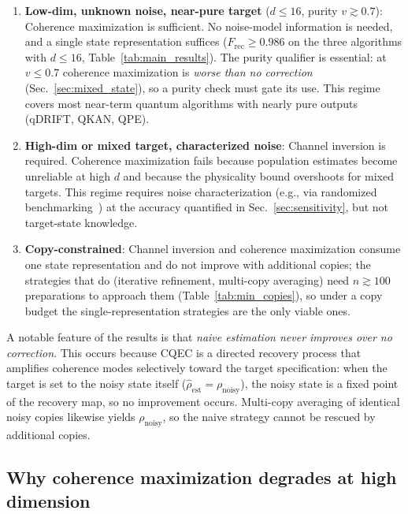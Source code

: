 \documentclass[pra,twocolumn,superscriptaddress,longbibliography,floatfix,nofootinbib]{revtex4-2}
\newcommand{\Frec}{F_\mathrm{rec}}
\newcommand{\rhon}{\rho_\mathrm{noisy}}
\newcommand{\rhoe}{\hat{\rho}_\mathrm{est}}
\begin{document}
\begin{enumerate}
\item \textbf{Low-dim, unknown noise, near-pure target} ($d \leq 16$, purity $v \gtrsim 0.7$): Coherence maximization is sufficient.
No noise-model information is needed, and a single state representation suffices ($\Frec \geq 0.986$ on the three algorithms with $d \leq 16$, Table~\ref{tab:main_results}).
The purity qualifier is essential: at $v \leq 0.7$ coherence maximization is \emph{worse than no correction} (Sec.~\ref{sec:mixed_state}), so a purity check must gate its use.
This regime covers most near-term quantum algorithms with nearly pure outputs (qDRIFT, QKAN, QPE).

\item \textbf{High-dim or mixed target, characterized noise}: Channel inversion is required.
Coherence maximization fails because population estimates become unreliable at high $d$ and because the physicality bound overshoots for mixed targets.
This regime requires noise characterization (e.g., via randomized benchmarking~\cite{Emerson2005,Knill2008,Magesan2011}) at the accuracy quantified in Sec.~\ref{sec:sensitivity}, but not target-state knowledge.

\item \textbf{Copy-constrained}: Channel inversion and coherence maximization consume one state representation and do not improve with additional copies; the strategies that do (iterative refinement, multi-copy averaging) need $n \gtrsim 100$ preparations to approach them (Table~\ref{tab:min_copies}), so under a copy budget the single-representation strategies are the only viable ones.
\end{enumerate}

A notable feature of the results is that \emph{naive estimation never improves over no correction}.
This occurs because CQEC is a directed recovery process that amplifies coherence modes selectively toward the target specification: when the target is set to the noisy state itself ($\rhoe = \rhon$), the noisy state is a fixed point of the recovery map, so no improvement occurs.
Multi-copy averaging of identical noisy copies likewise yields $\rhon$, so the naive strategy cannot be rescued by additional copies.


\subsection{Why coherence maximization degrades at high dimension}
\label{sec:cohmax_principle}
\end{document}

